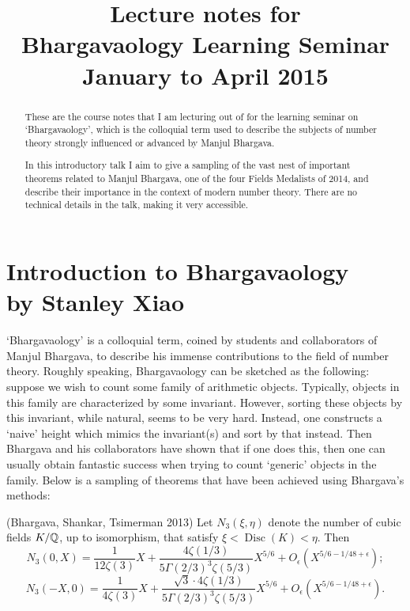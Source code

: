 \documentclass[12pt,amsfont]{amsart}
\begin{document}
\title{\bf Lecture notes for\\Bhargavaology Learning Seminar \\ January to April 2015}
\begin{abstract}
These are the course notes that I am lecturing out of for the learning seminar on `Bhargavaology', which is the colloquial term used to describe the subjects of number theory strongly influenced or advanced by Manjul Bhargava. 
\end{abstract}
\maketitle
\setcounter{tocdepth}{1}
\tableofcontents

\newpage
\section{Introduction to Bhargavaology \\ by Stanley Xiao}

\begin{abstract}
In this introductory talk I aim to give a sampling of the vast nest of important theorems related to Manjul Bhargava, one of the four Fields Medalists of 2014, and describe their importance in the context of modern number theory. There are no technical details in the talk, making it very accessible. 
\end{abstract}

`Bhargavaology' is a colloquial term, coined by students and collaborators of Manjul Bhargava, to describe his immense contributions to the field of number theory. Roughly speaking, Bhargavaology can be sketched as the following: suppose we wish to count some family of arithmetic objects. Typically, objects in this family are characterized by some invariant. However, sorting these objects by this invariant, while natural, seems to be very hard. Instead, one constructs a `naive' height which mimics the invariant(s) and sort by that instead. Then Bhargava and his collaborators have shown that if one does this, then one can usually obtain fantastic success when trying to count `generic' objects in the family. Below is a sampling of theorems that have been achieved using Bhargava's methods:

\begin{theorem} (Bhargava, Shankar, Tsimerman 2013) Let $N_3(\xi, \eta)$ denote the number of cubic fields $K/{\mathbb Q}$, up to isomorphism, that satisfy $\xi < \operatorname{Disc}(K) < \eta$. Then
\[N_3(0,X) = \frac{1}{12 \zeta(3)} X + \frac{4 \zeta(1/3)}{5 \Gamma(2/3)^3 \zeta(5/3)}X^{5/6} + O_\epsilon\left(X^{5/6 - 1/48 + \epsilon}\right);\]
\[N_3(-X,0) = \frac{1}{4 \zeta(3)} X + \frac{\sqrt{3} \cdot 4 \zeta(1/3)}{5 \Gamma(2/3)^3 \zeta(5/3)} X^{5/6} + O_\epsilon\left(X^{5/6 - 1/48 + \epsilon}\right).\]
\end{theorem}
\end{document}
